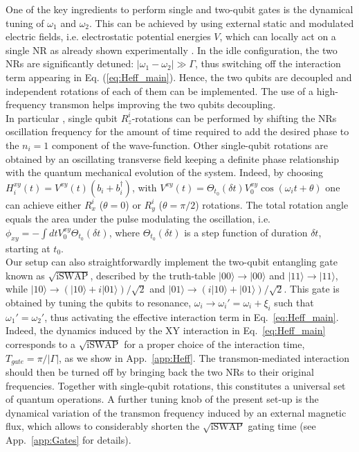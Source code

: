 \documentclass[aps,twocolumn,groupedaddress,superscriptaddress,floatfix,amsmath,amssymb,prb]{revtex4-1}
\begin{document}
One of the key ingredients to perform single and two-qubit gates is the dynamical tuning of $\omega_1$ and $\omega_2$. This can be achieved by using external static and modulated electric fields, i.e. electrostatic potential energies $V$, which can locally act on a single NR as already shown experimentally \cite{Postma2005,Kozinsky2006,Weber2014,Singh2014}. 
In the idle configuration, the two NRs are significantly detuned: $|\omega_1-\omega_2| \gg \Gamma$, thus switching off the interaction term appearing in Eq. (\ref{eq:Heff_main}). Hence, the two qubits are decoupled and independent rotations of each of them can be implemented. The use of a high-frequency transmon helps improving the two qubits decoupling. \\
In particular \cite{Rips2013}, single qubit $R^i_z$-rotations can be performed by shifting the NRs oscillation frequency for the amount of time required to add the desired phase to the $n_i=1$ component of the wave-function. 
Other single-qubit rotations are obtained by an oscillating transverse field keeping a definite phase relationship with the quantum mechanical evolution of the system. Indeed, by choosing $H^{xy}_i(t) = V^{xy} (t) (b_i + b_i^\dagger)$, with $V^{xy} (t) = \Theta_{t_0} (\delta t)V^{xy}_0 \cos (\omega_i t + \theta)$ one can achieve either $R_x^i$ ($\theta = 0$) or $R_y^i$ ($\theta = \pi/2$) rotations. The total rotation angle equals the area under the pulse modulating the oscillation, i.e. $\phi_{xy} = -\int dt  V^{xy}_0\Theta_{t_0}(\delta t)$, where $\Theta_{t_0}({\delta t})$ is a step function of duration $\delta t$, starting at $t_0$. \\ 
Our setup can also straightforwardly implement the two-qubit entangling gate known as $\sqrt{\text{iSWAP}}$, described by the truth-table 
$|0 0 \rangle \to | 0 0 \rangle$ and 
$|1 1\rangle \to | 1 1 \rangle$, while 
$|1 0\rangle \to (| 1 0 \rangle + i | 0 1 \rangle)/\sqrt{2}$ and 
$| 0 1 \rangle \to (i | 1 0 \rangle +  | 0 1 \rangle)/\sqrt{2}$.
This gate is obtained by tuning the qubits to resonance, $\omega_i \rightarrow \omega_i' = \omega_i + \xi_i$ such that $\omega_1' = \omega_2'$, thus activating the effective interaction term in Eq.~\eqref{eq:Heff_main}. 
Indeed, the dynamics induced by the XY interaction in Eq.~\eqref{eq:Heff_main} corresponds to a $\sqrt{\text{iSWAP}}$ for a proper choice of the interaction time, $T_{gate} = \pi/|\Gamma|$, as we show in App.~\ref{app:Heff}.
The transmon-mediated interaction should then be turned off by bringing back the two NRs to their original frequencies. %
Together with single-qubit rotations, this constitutes a universal set of quantum operations. 
A further tuning knob of the present set-up is the dynamical variation of the transmon frequency induced by an external magnetic flux, which allows to considerably shorten the $\sqrt{\text{iSWAP}}$ gating time (see App.~\ref{app:Gates} for details).
\end{document}
